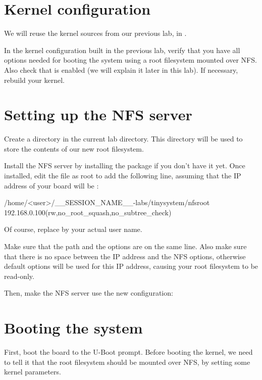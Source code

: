 \section{Kernel configuration}

We will reuse the kernel sources from our previous lab, in
.

In the kernel configuration built in the previous lab, verify that you
have all options needed for booting the system using a root filesystem
mounted over NFS. Also check that  is
enabled (we will explain it later in this lab). If necessary, rebuild
your kernel.

\section{Setting up the NFS server}

Create a  directory in the current lab directory. This
 directory will be used to store the contents of our new
root filesystem.

Install the NFS server by installing the 
package if you don't have it yet. Once installed, edit the
 file as root to add the following line, assuming that the
IP address of your board will be :

\begin{fileinput}
/home/<user>/__SESSION_NAME__-labs/tinysystem/nfsroot 192.168.0.100(rw,no_root_squash,no_subtree_check)
\end{fileinput}

Of course, replace  by your actual user name.

Make sure that the path and the options are on the same line.
Also make sure that there is no space between the IP address and the NFS
options, otherwise default options will be used for this IP address,
causing your root filesystem to be read-only.

Then, make the NFS server use the new configuration:


\section{Booting the system}

First, boot the board to the U-Boot prompt. Before booting the kernel,
we need to tell it that the root filesystem should be mounted over
NFS, by setting some kernel parameters.

